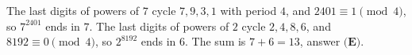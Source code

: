 The last digits of powers of $7$ cycle $7,9,3,1$ with period $4$, and $2401\equiv1\pmod4$, so $7^{2401}$ ends in $7$. The last digits of powers of $2$ cycle $2,4,8,6$, and $8192\equiv0\pmod4$, so $2^{8192}$ ends in $6$. The sum is $7+6=\boxed{13}$, answer $\textbf{(E)}$.
